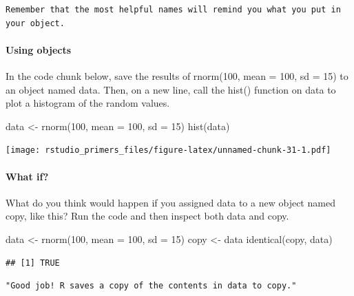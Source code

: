 \documentclass[
]{article}
\newenvironment{Shaded}{\begin{snugshade}}{\end{snugshade}}
\newcommand{\AttributeTok}[1]{\textcolor[rgb]{0.77,0.63,0.00}{#1}}
\newcommand{\DecValTok}[1]{\textcolor[rgb]{0.00,0.00,0.81}{#1}}
\newcommand{\FunctionTok}[1]{\textcolor[rgb]{0.00,0.00,0.00}{#1}}
\newcommand{\NormalTok}[1]{#1}
\newcommand{\OtherTok}[1]{\textcolor[rgb]{0.56,0.35,0.01}{#1}}
\begin{document}
\begin{verbatim}
Remember that the most helpful names will remind you what you put in your object.
\end{verbatim}

\hypertarget{using-objects}{%
\paragraph{Using objects}\label{using-objects}}

In the code chunk below, save the results of rnorm(100, mean = 100, sd =
15) to an object named data. Then, on a new line, call the hist()
function on data to plot a histogram of the random values.

\begin{Shaded}
\begin{Highlighting}[]
\NormalTok{data }\OtherTok{\textless{}{-}} \FunctionTok{rnorm}\NormalTok{(}\DecValTok{100}\NormalTok{, }\AttributeTok{mean =} \DecValTok{100}\NormalTok{, }\AttributeTok{sd =} \DecValTok{15}\NormalTok{)}
\FunctionTok{hist}\NormalTok{(data)}
\end{Highlighting}
\end{Shaded}

\texttt{[image: rstudio\_primers\_files/figure-latex/unnamed-chunk-31-1.pdf]}

\hypertarget{what-if}{%
\paragraph{What if?}\label{what-if}}

What do you think would happen if you assigned data to a new object
named copy, like this? Run the code and then inspect both data and copy.

\begin{Shaded}
\begin{Highlighting}[]
\NormalTok{data }\OtherTok{\textless{}{-}} \FunctionTok{rnorm}\NormalTok{(}\DecValTok{100}\NormalTok{, }\AttributeTok{mean =} \DecValTok{100}\NormalTok{, }\AttributeTok{sd =} \DecValTok{15}\NormalTok{)}
\NormalTok{copy }\OtherTok{\textless{}{-}}\NormalTok{ data}
\FunctionTok{identical}\NormalTok{(copy, data)}
\end{Highlighting}
\end{Shaded}

\begin{verbatim}
## [1] TRUE
\end{verbatim}

\begin{verbatim}
"Good job! R saves a copy of the contents in data to copy."
\end{verbatim}
\end{document}
